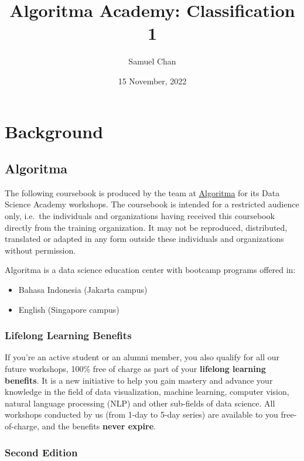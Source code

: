 \documentclass[
]{article}
\title{Algoritma Academy: Classification 1}
\author{Samuel Chan}
\date{15 November, 2022}
\providecommand{\tightlist}{%
  \setlength{\itemsep}{0pt}\setlength{\parskip}{0pt}}
\begin{document}
\maketitle

\hypertarget{background}{%
\section{Background}\label{background}}

\hypertarget{algoritma}{%
\subsection{Algoritma}\label{algoritma}}

The following coursebook is produced by the team at
\href{https://algorit.ma}{Algoritma} for its Data Science Academy
workshops. The coursebook is intended for a restricted audience only,
i.e.~the individuals and organizations having received this coursebook
directly from the training organization. It may not be reproduced,
distributed, translated or adapted in any form outside these individuals
and organizations without permission.

Algoritma is a data science education center with bootcamp programs
offered in:

\begin{itemize}
\tightlist
\item
  Bahasa Indonesia (Jakarta campus)\\
\item
  English (Singapore campus)
\end{itemize}

\hypertarget{lifelong-learning-benefits}{%
\subsubsection{Lifelong Learning
Benefits}\label{lifelong-learning-benefits}}

If you're an active student or an alumni member, you also qualify for
all our future workshops, 100\% free of charge as part of your
\textbf{lifelong learning benefits}. It is a new initiative to help you
gain mastery and advance your knowledge in the field of data
visualization, machine learning, computer vision, natural language
processing (NLP) and other sub-fields of data science. All workshops
conducted by us (from 1-day to 5-day series) are available to you
free-of-charge, and the benefits \textbf{never expire}.

\hypertarget{second-edition}{%
\subsubsection{Second Edition}\label{second-edition}}
\end{document}
